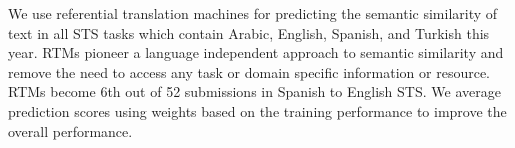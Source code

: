 We use referential translation machines for predicting the semantic similarity of text in all STS tasks which contain Arabic, English, Spanish, and Turkish this year. RTMs pioneer a language independent approach to semantic similarity and remove the need to access any task or domain specific information or resource. RTMs become 6th out of 52 submissions in Spanish to English STS. We average prediction scores using weights based on the training performance to improve the overall performance.
